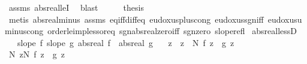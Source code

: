 \begin{isabellebody}
\ assms\ abs{\isacharunderscore}{\kern0pt}real{\isacharunderscore}{\kern0pt}leI\ \isamarkupfalse%
\ blast\isanewline
\ \ \isamarkupfalse%
\ \isamarkupfalse%
\ {\isacharquery}{\kern0pt}thesis\ \isamarkupfalse%
\ {\isacharparenleft}{\kern0pt}metis\ abs{\isacharunderscore}{\kern0pt}real{\isacharunderscore}{\kern0pt}minus\ assms{\isacharparenleft}{\kern0pt}{}{\isacharcomma}{\kern0pt}{}{\isacharparenright}{\kern0pt}\ eq{\isacharunderscore}{\kern0pt}iff{\isacharunderscore}{\kern0pt}diff{\isacharunderscore}{\kern0pt}eq{\isacharunderscore}{\kern0pt}{}\ eudoxus{\isacharunderscore}{\kern0pt}plus{\isacharunderscore}{\kern0pt}cong\ eudoxus{\isacharunderscore}{\kern0pt}sgn{\isacharunderscore}{\kern0pt}iff{\isacharparenleft}{\kern0pt}{}{\isacharparenright}{\kern0pt}\ eudoxus{\isacharunderscore}{\kern0pt}uminus{\isacharunderscore}{\kern0pt}cong\ order{\isacharunderscore}{\kern0pt}le{\isacharunderscore}{\kern0pt}imp{\isacharunderscore}{\kern0pt}less{\isacharunderscore}{\kern0pt}or{\isacharunderscore}{\kern0pt}eq\ sgn{\isacharunderscore}{\kern0pt}abs{\isacharunderscore}{\kern0pt}real{\isacharunderscore}{\kern0pt}zero{\isacharunderscore}{\kern0pt}iff\ sgn{\isacharunderscore}{\kern0pt}zero\ slope{\isacharunderscore}{\kern0pt}refl{\isacharparenright}{\kern0pt}\isanewline
{}\isamarkupfalse%
%
\endisatagproof
{\isafoldproof}%
%
\isadelimproof
\isanewline
%
\endisadelimproof
\isanewline
{}\isamarkupfalse%
\ abs{\isacharunderscore}{\kern0pt}real{\isacharunderscore}{\kern0pt}lessD{\isacharcolon}{\kern0pt}\isanewline
\ \ \ {\isachardoublequoteopen}slope\ f{\isachardoublequoteclose}\ {\isachardoublequoteopen}slope\ g{\isachardoublequoteclose}\ {\isachardoublequoteopen}abs{\isacharunderscore}{\kern0pt}real\ f\ {\isachargreater}{\kern0pt}\ abs{\isacharunderscore}{\kern0pt}real\ g{\isachardoublequoteclose}\isanewline
\ \ \ z\ \ {\isachardoublequoteopen}z\ {\isasymge}\ N{\isachardoublequoteclose}\ {\isachardoublequoteopen}f\ z\ {\isachargreater}{\kern0pt}\ g\ z{\isachardoublequoteclose}\isanewline
%
\isadelimproof
%
\endisadelimproof
%
\isatagproof
{}\isamarkupfalse%
\ {\isacharminus}{\kern0pt}\isanewline
\ \ \isacommand{{\isacharbraceleft}{\kern0pt}}\isamarkupfalse%
\isanewline
\ \ \ \ \isamarkupfalse%
\ {\isachardoublequoteopen}{\isasymexists}N{\isachardot}{\kern0pt}\ {\isasymforall}z{\isasymge}N{\isachardot}{\kern0pt}\ f\ z\ {\isasymle}\ g\ z{\isachardoublequoteclose}\isanewline

\end{isabellebody}
